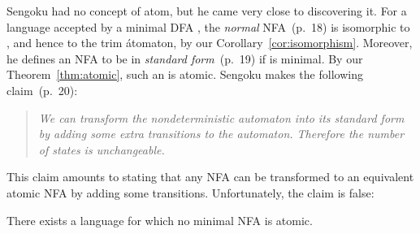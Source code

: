 \documentclass{llncs}
\begin{document}
Sengoku had no concept of atom, but he came very close to discovering it.
For a language accepted by a minimal DFA , the \emph{normal} 
NFA~\cite{Sen92}(p.~18) is isomorphic to , and hence to 
the trim \'atomaton, by our Corollary~\ref{cor:isomorphism}. 
Moreover, he defines an NFA  to be in \emph{standard form}~\cite{Sen92}(p.~19) 
if  is minimal.
By our Theorem~\ref{thm:atomic}, such an  is atomic.
Sengoku makes the following claim~\cite{Sen92}(p.~20):
\begin{quote}
\vskip-0.1cm
\emph{We can transform the nondeterministic automaton into its standard form 
by adding some extra transitions to the automaton. Therefore the number of 
states is unchangeable.}
\end{quote}
\vskip-0.1cm
This claim amounts to stating that any NFA can be transformed to an equivalent  
atomic NFA by adding some transitions. Unfortunately, the claim is false:
\begin{theorem}
\label{thm:Sengoku}
There exists a language for which no minimal NFA is atomic.
\end{theorem}
\end{document}
